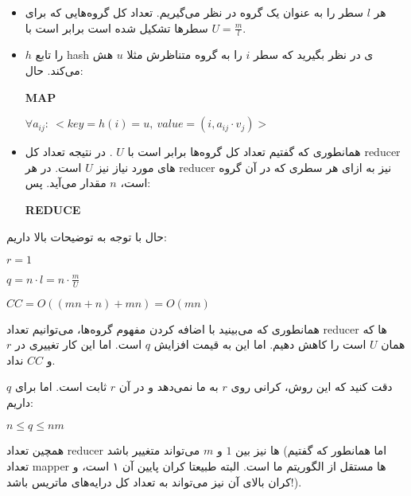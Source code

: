\documentclass[a4paper,12pt]{article}
\begin{document}
\begin{itemize}
	\item 
	هر 
	$l$
	سطر را به عنوان یک گروه در نظر می‌گیریم. تعداد کل گروه‌هایی که برای سطر‌ها تشکیل شده است برابر است با
	$U = \frac{m}{l}$. 

	\item 
	$h$
	را تابع
	hash
	ی در نظر بگیرید که سطر 
	$i$
	را به گروه متناظرش مثلا
	$u$
	هش می‌کند. حال:

	\begin{LTR}
	\textbf{MAP}

	$\forall a_{ij} : \ < key = h(i) = u, \ value = (i, a_{ij} \cdot v_j) >$
	\end{LTR}
	
	\item 
	همانطوری که گفتیم تعداد کل گروه‌ها برابر است با 
	$U$
	. در نتیجه تعداد کل 
	reducer
	های مورد نیاز نیز
	$U$
	است. در هر 
	reducer
	نیز به ازای هر سطری که در آن گروه است، 
	$n$
	مقدار می‌آید. پس:
	
	\begin{latin}
	\textbf{REDUCE}


	\end{latin}
	
\end{itemize}

حال با توجه به توضیحات بالا داریم:


 \begin{LTR}
$r = 1$

$q = n \cdot l = n \cdot \frac{m}{U}$

$CC =  O( (mn + n) + mn) = O(mn)$

 \end{LTR}

  همانطوری که می‌بینید با اضافه کردن مفهوم گروه‌ها، می‌توانیم تعداد
  reducer
  ها که همان
  $U$
  است را کاهش دهیم. اما این به قیمت افزایش 
  $q$
  است. اما این کار تغییری در 
  $r$
  و 
  $CC$
  نداد. 

  دقت کنید که این روش، کرانی روی 
  $r$
  به ما نمی‌دهد و در آن
  $r$
  ثابت است. اما برای 
  $q$
  داریم:
  \begin{latin}
  $n \leq q \leq nm$
  \end{latin}
  
همچین تعداد 
reducer
ها نیز بین 
$1$
و
$m$
می‌تواند متغییر باشد (اما همانطور که گفتیم تعداد 
mapper
ها مستقل از الگوریتم ما است. البته طبیعتا کران پایین آن ۱ است، و کران بالای آن نیز می‌تواند به تعداد کل درایه‌های ماتریس باشد!).
\end{document}
